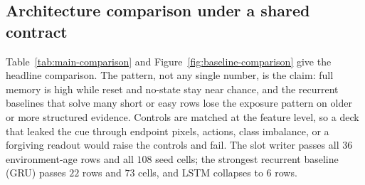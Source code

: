 \begin{table}[t]
\centering
\footnotesize
\caption{Every reported age-15 slot balanced accuracy with its protocol and
settings.  ``One-shot'' re-reads the full prefix (bounded output); ``streaming''
evicts chunks (bounded context, chunk $K{=}4$).  Values are read from the source
artifacts of each protocol.}
\label{tab:headline-recon}
\setlength{\tabcolsep}{4pt}
\end{table}

\subsection{Architecture comparison under a shared contract}
Table~\ref{tab:main-comparison} and Figure~\ref{fig:baseline-comparison} give
the headline comparison.  The pattern, not any single number, is the claim: full
memory is high while reset and no-state stay near chance, and the recurrent
baselines that solve many short or easy rows lose the exposure pattern on older
or more structured evidence.  Controls are matched at the feature level, so a
deck that leaked the cue through endpoint pixels, actions, class imbalance, or a
forgiving readout would raise the controls and fail.  The slot writer passes all
$36$ environment-age rows and all $108$ seed cells; the strongest recurrent
baseline (GRU) passes $22$ rows and $73$ cells, and LSTM collapses to $6$ rows.

\begin{table}[t]
\centering
\footnotesize
\caption{Controlled-age retention and exposure over 12 decks, 3 ages, and 3
seeds (protocol~P0, one-shot writer).  Full, reset, and no-state are balanced
accuracies from the shared post-hoc readout; controls are matched on the same
held-out rows.}
\label{tab:main-comparison}

\end{table}

